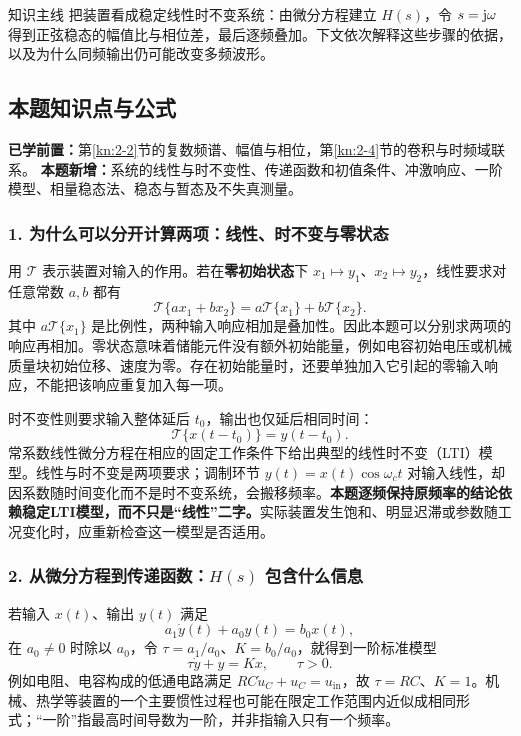 \begin{focusbox}{知识主线}
把装置看成稳定线性时不变系统：由微分方程建立 $H(s)$，令 $s=\mathrm{j}\omega$ 得到正弦稳态的幅值比与相位差，最后逐频叠加。下文依次解释这些步骤的依据，以及为什么同频输出仍可能改变多频波形。
\end{focusbox}

\subsection*{本题知识点与公式}
\label{kn:3-1}
\noindent\textbf{已学前置：}第\ref{kn:2-2}节的复数频谱、幅值与相位，第\ref{kn:2-4}节的卷积与时频域联系。
\textbf{本题新增：}系统的线性与时不变性、传递函数和初值条件、冲激响应、一阶模型、相量稳态法、稳态与暂态及不失真测量。

\subsubsection*{1. 为什么可以分开计算两项：线性、时不变与零状态}
用 $\mathcal T$ 表示装置对输入的作用。若在\textbf{零初始状态}下 $x_1\mapsto y_1$、$x_2\mapsto y_2$，线性要求对任意常数 $a,b$ 都有
\[
\mathcal T\{ax_1+bx_2\}=a\mathcal T\{x_1\}+b\mathcal T\{x_2\}.
\]
其中 $a\mathcal T\{x_1\}$ 是比例性，两种输入响应相加是叠加性。因此本题可以分别求两项的响应再相加。零状态意味着储能元件没有额外初始能量，例如电容初始电压或机械质量块初始位移、速度为零。存在初始能量时，还要单独加入它引起的零输入响应，不能把该响应重复加入每一项。

时不变性则要求输入整体延后 $t_0$，输出也仅延后相同时间：
\[
\mathcal T\{x(t-t_0)\}=y(t-t_0).
\]
常系数线性微分方程在相应的固定工作条件下给出典型的线性时不变（LTI）模型。线性与时不变是两项要求；调制环节 $y(t)=x(t)\cos\omega_ct$ 对输入线性，却因系数随时间变化而不是时不变系统，会搬移频率。\textbf{本题逐频保持原频率的结论依赖稳定LTI模型，而不只是“线性”二字。}实际装置发生饱和、明显迟滞或参数随工况变化时，应重新检查这一模型是否适用。

\subsubsection*{2. 从微分方程到传递函数：$H(s)$ 包含什么信息}
若输入 $x(t)$、输出 $y(t)$ 满足
\[
a_1\dot y(t)+a_0y(t)=b_0x(t),
\]
在 $a_0\ne0$ 时除以 $a_0$，令 $\tau=a_1/a_0$、$K=b_0/a_0$，就得到一阶标准模型
\[
\boxed{\tau\dot y+y=Kx},\qquad \tau>0.
\]
例如电阻、电容构成的低通电路满足 $RC\dot u_C+u_C=u_{\mathrm{in}}$，故 $\tau=RC$、$K=1$。机械、热学等装置的一个主要惯性过程也可能在限定工作范围内近似成相同形式；“一阶”指最高时间导数为一阶，并非指输入只有一个频率。

